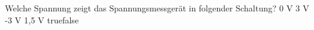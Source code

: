     {Welche Spannung zeigt das Spannungsmessgerät in folgender Schaltung? }
    {0 V}
    {3 V}
    {-3 V}
    {1,5 V}
    {true}{false}